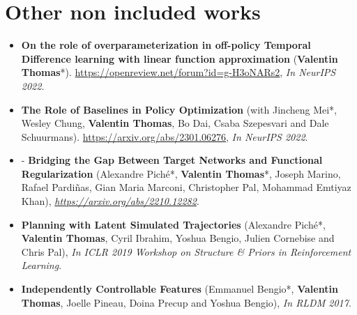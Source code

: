 \chapter*{Other non included works}

\begin{itemize}
\item{\bf On the role of overparameterization in off-policy Temporal
Difference learning with linear function
approximation} (\textbf{Valentin Thomas}*). \url{https://openreview.net/forum?id=g-H3oNARs2}, {\em In {\color{blue} NeurIPS 2022}}.

\item{\bf The Role of Baselines in Policy Optimization}
    (with Jincheng Mei*, Wesley Chung, \textbf{Valentin Thomas}, Bo Dai, Csaba
    Szepesvari and Dale Schuurmans).  \url{https://arxiv.org/abs/2301.06276}, {\em In {\color{blue} NeurIPS 2022}}.
    
\item{- \bf Bridging the Gap Between Target Networks and Functional Regularization}
    (Alexandre Pich\'{e}*, \textbf{Valentin Thomas}*, Joseph Marino, Rafael Pardi\~{n}as, Gian Maria Marconi, Christopher Pal, Mohammad Emtiyaz Khan), {\em \url{https://arxiv.org/abs/2210.12282}}.

\item{\bf Planning with Latent Simulated Trajectories} (Alexandre Pich\'{e}*, \textbf{Valentin Thomas}, Cyril Ibrahim, Yoshua Bengio, Julien Cornebise and Chris
    Pal), {\em  In {\color{olive} ICLR 2019 Workshop} on Structure \& Priors in Reinforcement
Learning}.

\item{\bf Independently Controllable Features} (Emmanuel Bengio*, \textbf{Valentin Thomas}, Joelle Pineau, Doina Precup and Yoshua Bengio), {\em In {\color{blue}RLDM 2017}}.
\end{itemize}
